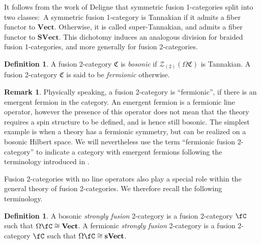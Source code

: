 \documentclass[11pt,reqno]{amsart}
\newcommand{\Vect}{\mathbf{Vect}}
\newcommand{\sVect}{\mathbf{sVect}}
\numberwithin{equation}{section}
\theoremstyle{plain}
\theoremstyle{definition}
\newtheorem{defn}[equation]{Definition}
\newtheorem{rem}[equation]{Remark}
\begin{document}
It follows from the work of Deligne \cite{deligne2002} that symmetric fusion 1-categories split into two classes:\ A symmetric fusion 1-category is Tannakian if it admits a fiber functor to $\mathbf{Vect}$. Otherwise, it is called super-Tannakian, and admits a fiber functor to $\mathbf{SVect}$. This dichotomy induces an analogous division for braided fusion 1-categories, and more generally for fusion 2-categories.

\begin{defn}\label{def:stronglyfusion}
    A fusion 2-category $\mathfrak{C}$ is \textit{bosonic} if $\mathcal{Z}_{(2)}(\Omega\mathfrak{C})$ is Tannakian. A fusion 2-category $\mathfrak{C}$ is said to be \textit{fermionic} otherwise.
\end{defn}

\begin{rem}
Physically speaking, a fusion 2-category is ``fermionic'', if there is an emergent fermion in the category. An emergent fermion is a fermionic line operator, however the presence of this operator does not mean that the theory requires a spin structure to be defined, and is hence still bosonic. The simplest example is when a theory has a fermionic symmetry, but can be realized on a bosonic Hilbert space. We will nevertheless use the term ``fermionic fusion 2-category'' to indicate a category with emergent fermions following the terminology introduced in \cite{JFY,D9}.
\end{rem}

Fusion 2-categories with no line operators also play a special role within the general theory of fusion 2-categories. We therefore recall the following terminology.

\begin{defn}\label{def:strongly}
A bosonic \textit{strongly fusion} 2-category is a fusion 2-category $\fC$ such that $\Omega \fC \cong \Vect$. A fermionic \textit{strongly fusion} 2-category is a fusion 2-category $\fC$ such that $\Omega \fC \cong \sVect$.
\end{defn}

\end{document}
